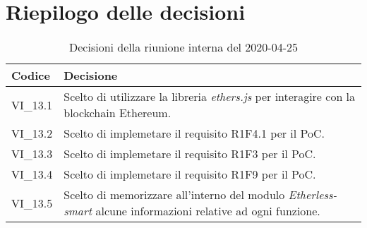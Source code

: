 \section{Riepilogo delle decisioni}
\begin{longtable}{ 
	 >{\centering}p{} >{}p{} }
	
	\caption{Decisioni della riunione interna del 2020-04-25}\\	
	
	\textbf{\color{white}Codice} & 
	\textbf{\color{white}Decisione} 
	\tabularnewline  
	\endhead
	
	VI\_13.1 & Scelto di utilizzare la libreria \textit{ethers.js} per interagire con la blockchain Ethereum. \\
	VI\_13.2 & Scelto di implemetare il requisito R1F4.1 per il PoC. \\
	VI\_13.3 & Scelto di implemetare il requisito R1F3 per il PoC. \\
	VI\_13.4 & Scelto di implemetare il requisito R1F9 per il PoC. \\	
	VI\_13.5 & Scelto di memorizzare all'interno del modulo \textit{Etherless-smart} alcune informazioni relative ad ogni funzione. \\
	

\end{longtable}